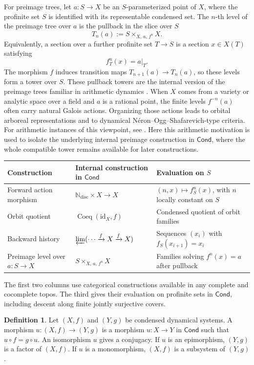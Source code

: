 \documentclass[10pt]{amsart}
\newcommand{\Cond}{\mathsf{Cond}}
\newcommand{\Coeq}{\operatorname{Coeq}}
\newcommand{\Ndisc}{\mathbb{N}_{\mathrm{disc}}}
\theoremstyle{plain}
\theoremstyle{definition}
\newtheorem{definition}[theorem]{Definition}
\begin{document}
For preimage trees, let $a:S\to X$ be an $S$-parameterized point of $X$, where
the profinite set $S$ is identified with its representable condensed set. The
$n$-th level of the preimage tree over $a$ is the pullback in the slice over $S$
\[
  T_n(a):=S\times_{X,\,a,\,f^n}X.
\]
Equivalently, a section over a further profinite set $T\to S$ is a section
$x\in X(T)$ satisfying
\[
  f_T^n(x)=a|_T.
\]
The morphism $f$ induces transition maps $T_{n+1}(a)\to T_n(a)$, so these
levels form a tower over $S$.
These pullback towers are the internal version of the preimage trees familiar
in arithmetic dynamics \cite{SilvermanADS}. When $X$ comes from a variety or
analytic space over a field and $a$ is a rational point, the finite levels
$f^{-n}(a)$ often carry natural Galois actions. Organizing those actions leads
to orbital arboreal representations and to dynamical
N\'eron--Ogg--Shafarevich-type criteria. For arithmetic instances of this
viewpoint, see \cite{PerezBuendiaNOS}. Here this arithmetic motivation is used
to isolate the underlying internal preimage construction in $\Cond$, where the
whole compatible tower remains available for later constructions.

\begin{center}
\small
\begin{tabular}{>{\raggedright\arraybackslash}p{}|>{\raggedright\arraybackslash}p{}|>{\raggedright\arraybackslash}p{}}
Construction & Internal construction in $\Cond$ & Evaluation on $S$\\
\hline
Forward action morphism &
$\Ndisc\times X\to X$ &
$(n,x)\mapsto f_S^n(x)$, with $n$ locally constant on $S$\\
Orbit quotient &
$\Coeq(\mathrm{id}_X,f)$ &
Condensed quotient of orbit families\\
Backward history &
$\varprojlim(\cdots\xrightarrow f X\xrightarrow f X)$ &
Sequences $(x_i)$ with $f_S(x_{i+1})=x_i$\\
Preimage level over $a:S\to X$ &
$S\times_{X,\,a,\,f^n}X$ &
Families solving $f^n(x)=a$ after pullback
\end{tabular}
\end{center}

The first two columns use categorical constructions available in any complete
and cocomplete topos. The third gives their evaluation on profinite sets in
$\Cond$, including descent along finite jointly surjective covers.

\begin{definition}
Let $(X,f)$ and $(Y,g)$ be condensed dynamical systems. A morphism
$u:(X,f)\to(Y,g)$ is a morphism $u:X\to Y$ in $\Cond$ such that
$u\circ f=g\circ u$. An isomorphism $u$ gives a conjugacy. If $u$ is an
epimorphism, $(Y,g)$ is a factor of $(X,f)$. If $u$ is a monomorphism, $(X,f)$
is a subsystem of $(Y,g)$.
\end{definition}
\end{document}
